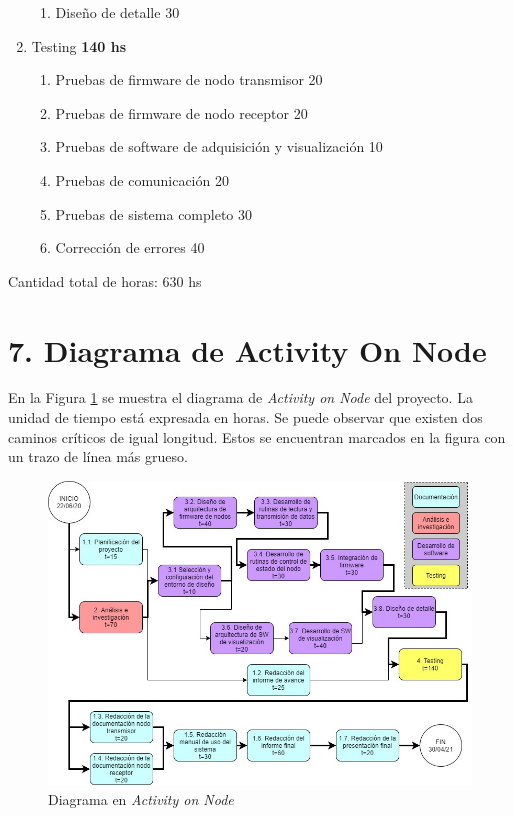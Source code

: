 \documentclass[11pt]{charter}
\begin{document}
\begin{enumerate}
\begin{enumerate}
	\item Diseño de detalle														\hfill 30
	\end{enumerate}
\item Testing																	\hfill \textbf{140 hs}
	\begin{enumerate}
	\item Pruebas de firmware de nodo transmisor								\hfill 20
	\item Pruebas de firmware de nodo receptor									\hfill 20
	\item Pruebas de software de adquisición y visualización					\hfill 10
	\item Pruebas de comunicación												\hfill 20
	\item Pruebas de sistema completo											\hfill 30
	\item Corrección de errores													\hfill 40
	\end{enumerate}
\end{enumerate}

Cantidad total de horas: 630 hs

\newpage 
\section{7. Diagrama de Activity On Node}
\label{sec:AoN}

En la Figura \ref{fig:AoN} se muestra el diagrama de \textit{Activity on Node} del proyecto. La unidad de tiempo está expresada en horas.
Se puede observar que existen dos caminos críticos de igual longitud. Estos se encuentran marcados en la figura con un trazo de línea más grueso.
\begin{figure}[htpb]
\centering 
\includegraphics[width=.8\textwidth]{./Figuras/AON.jpg}
\caption{Diagrama en \textit{Activity on Node}}
\label{fig:AoN}
\end{figure}
\end{document}
